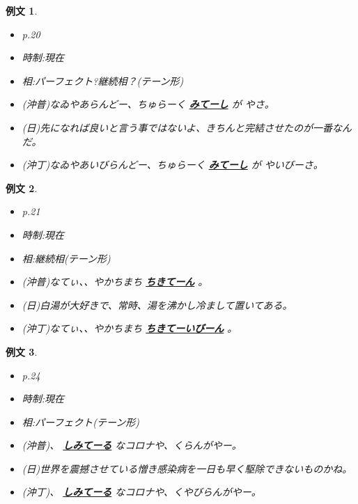 \documentclass[a4j,12pt]{jarticle}
\theoremstyle{break}
\newtheorem{example}{例文}
\newcommand{\highlight}[1]{
  \textbf{\underline{#1}}
}
\begin{document}
\begin{example}
  \begin{itemize}
  \item p.20
  \item 時制:現在
  \item 相:パーフェクト?継続相？(テーン形)
  \item (沖普)なゐやあらんどー、ちゅらーく\highlight{みてーし}が やさ。
  \item (日)先になれば良いと言う事ではないよ、きちんと完結させたのが一番なんだ。
  \item (沖丁)なゐやあいびらんどー、ちゅらーく\highlight{みてーし}が やいびーさ。
  \end{itemize}
\end{example}
\begin{example}
  \begin{itemize}
  \item p.21
  \item 時制:現在
  \item 相:継続相(テーン形)
  \item (沖普)なてぃ、、やかちまち\highlight{ちきてーん}。
  \item (日)白湯が大好きで、常時、湯を沸かし冷まして置いてある。
  \item (沖丁)なてぃ、、やかちまち\highlight{ちきてーいびーん}。
  \end{itemize}
\end{example}
\begin{example}
  \begin{itemize}
  \item p.24
  \item 時制:現在
  \item 相:パーフェクト(テーン形)
  \item (沖普)、\highlight{しみてーる}なコロナや、くらんがやー。
  \item (日)世界を震撼させている憎き感染病を一日も早く駆除できないものかね。
  \item (沖丁)、\highlight{しみてーる}なコロナや、くやびらんがやー。
  \end{itemize}
\end{example}
\end{document}
